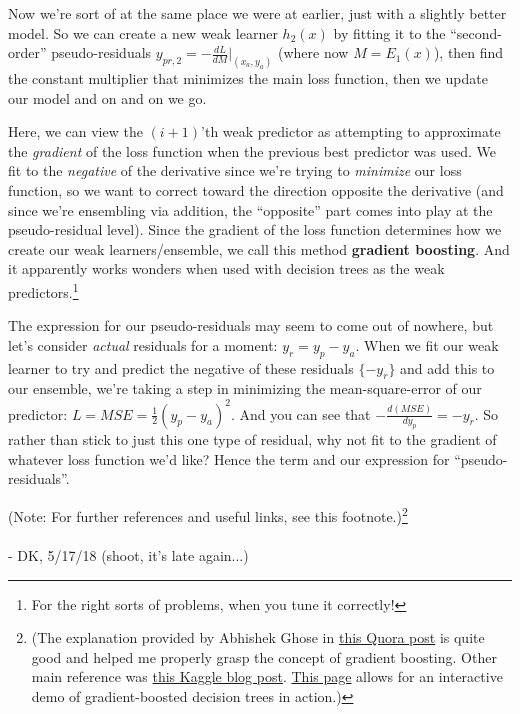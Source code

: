 \documentclass[letterpaper,12pt]{report}
\begin{document}
Now we're sort of at the same place we were at earlier, just with a slightly better model.
So we can create a new weak learner \(h_2(x)\) by fitting it to the ``second-order''
pseudo-residuals \(y_{pr,2} = - \frac{dL}{dM} \Bigr|_{\left(x_a, y_a\right)}\) 
(where now \(M = E_1(x)\)),
then find the constant multiplier that minimizes the
main loss function, then we update our model \textemdash and on and on we go.

Here, we can view the \((i+1)\)'th weak predictor as attempting 
to approximate the \emph{gradient}
of the loss function when the previous best predictor was used.
We fit to the \emph{negative} of the derivative since we're trying to \emph{minimize}
our loss function, so we want to correct toward the direction opposite the derivative
(and since we're ensembling via addition, the ``opposite'' part comes into play
at the pseudo-residual level).
Since the gradient of the loss function determines how we create our weak learners/ensemble, 
we call this method \textbf{gradient boosting}. And it apparently works wonders
when used with decision trees as the weak predictors.\footnote{
  For the right sorts of problems, when you tune it correctly!
  }

The expression for our pseudo-residuals may seem to come out of nowhere, but let's
consider \emph{actual} residuals for a moment: \(y_r = y_p - y_a\). When we fit
our weak learner to try and predict the negative of these residuals \(\{-y_r\}\) 
and add this to our ensemble, 
we're taking a step in minimizing the mean-square-error
of our predictor: \(L = MSE = \frac{1}{2} \left(y_p - y_a\right)^2\). And you can see that
\(- \frac{d(MSE)}{dy_p} = -y_r\). So rather than stick to just this one type of residual,
why not fit to the gradient of whatever loss function we'd like? 
Hence the term and our expression for ``pseudo-residuals''.

(Note: For further references and useful links, see this footnote.)\footnote{
(The explanation provided by Abhishek Ghose in \href{https://www.quora.com/What-is-an-intuitive-explanation-of-Gradient-Boosting}
{this Quora post} is quite good and helped me properly grasp
the concept of gradient boosting. Other main reference was
\href{http://blog.kaggle.com/2017/01/23/a-kaggle-master-explains-gradient-boosting/}
{this Kaggle blog post}. \href{http://arogozhnikov.github.io/2016/07/05/gradient_boosting_playground.html}
{This page} allows for an interactive demo of gradient-boosted decision trees in action.)
}
\\
\\
- DK, 5/17/18 (shoot, it's late again...)
\end{document}
